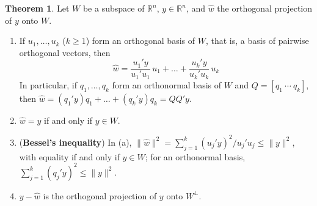 \documentclass[12pt]{article}
\newcommand{\R}{\mathbb R}
\theoremstyle{definition}
\newtheorem{theorem}{Theorem}
\begin{document}
\begin{theorem}\label{r6-thm-projection-onb}
Let \(W\) be a subspace of \(\R^n\), \(y\in\R^n\), and \(\hat w\) the orthogonal projection of \(y\) onto \(W\).
\begin{enumerate}
\item If \(u_1,\dots,u_k\) (\(k\geqslant1\)) form an orthogonal basis of \(W\), that is, a basis of pairwise
orthogonal vectors, then
\[
\hat w=\frac{u_1'y}{u_1'u_1}\,u_1+\dots+\frac{u_k'y}{u_k'u_k}\,u_k
\]
In particular, if \(q_1,\dots,q_k\) form an orthonormal basis of \(W\) and \(Q=[q_1\ \cdots\ q_k]\), then
\(\hat w=(q_1'y)q_1+\dots+(q_k'y)q_k=QQ'y\).
\item \(\hat w=y\) if and only if \(y\in W\).
\item (\textbf{Bessel's inequality}) In (a),
\(\lVert\hat w\rVert^2=\sum_{j=1}^k(u_j'y)^2/u_j'u_j\leqslant\lVert y\rVert^2\), with equality if and only if \(y\in W\);
for an orthonormal basis, \(\sum_{j=1}^k(q_j'y)^2\leqslant\lVert y\rVert^2\).
\item \(y-\hat w\) is the orthogonal projection of \(y\) onto \(W^\perp\).
\end{enumerate}
\end{theorem}
\end{document}
